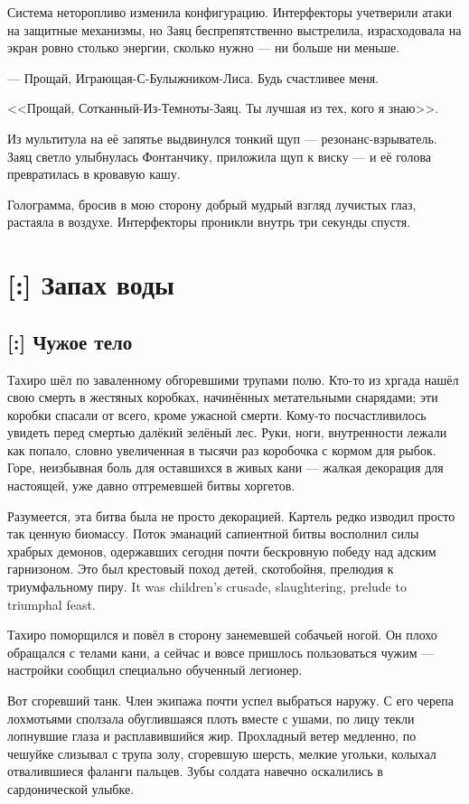 Система неторопливо изменила конфигурацию.
Интерфекторы учетверили атаки на защитные механизмы, но Заяц беспрепятственно выстрелила, израсходовала на экран ровно столько энергии, сколько нужно --- ни больше ни меньше.

--- Прощай, Играющая-С-Булыжником-Лиса.
Будь счастливее меня.

<<Прощай, Сотканный-Из-Темноты-Заяц.
Ты лучшая из тех, кого я знаю>>.

Из мультитула на её запятье выдвинулся тонкий щуп --- резонанс-взрыватель.
Заяц светло улыбнулась Фонтанчику, приложила щуп к виску --- и её голова превратилась в кровавую кашу.

Голограмма, бросив в мою сторону добрый мудрый взгляд лучистых глаз, растаяла в воздухе.
Интерфекторы проникли внутрь три секунды спустя.

\chapter{[:] Запах воды}

\section{[:] Чужое тело}

Тахиро шёл по заваленному обгоревшими трупами полю.
Кто-то из хргада нашёл свою смерть в жестяных коробках, начинённых метательными снарядами;
эти коробки спасали от всего, кроме ужасной смерти.
Кому-то посчастливилось увидеть перед смертью далёкий зелёный лес.
Руки, ноги, внутренности лежали как попало, словно увеличенная в тысячи раз коробочка с кормом для рыбок.
Горе, неизбывная боль для оставшихся в живых кани --- жалкая декорация для настоящей, уже давно отгремевшей битвы хоргетов.

Разумеется, эта битва была не просто декорацией.
Картель редко изводил просто так ценную биомассу.
Поток эманаций сапиентной битвы восполнил силы храбрых демонов, одержавших сегодня почти бескровную победу над адским гарнизоном.
{Это был крестовый поход детей, скотобойня, прелюдия к триумфальному пиру.}
{It was children's crusade, slaughtering, prelude to triumphal feast.}

Тахиро поморщился и повёл в сторону занемевшей собачьей ногой.
Он плохо обращался с телами кани, а сейчас и вовсе пришлось пользоваться чужим --- настройки сообщил специально обученный легионер.

Вот сгоревший танк.
Член экипажа почти успел выбраться наружу.
С его черепа лохмотьями сползала обуглившаяся плоть вместе с ушами, по лицу текли лопнувшие глаза и расплавившийся жир.
Прохладный ветер медленно, по чешуйке слизывал с трупа золу, сгоревшую шерсть, мелкие угольки, колыхал отвалившиеся фаланги пальцев.
Зубы солдата навечно оскалились в сардонической улыбке.

